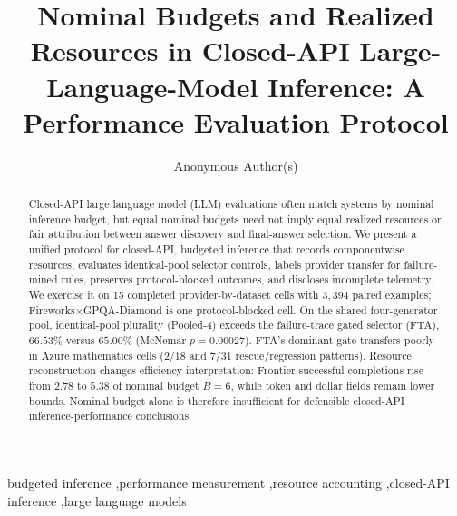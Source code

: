 \documentclass[preprint,12pt]{elsarticle}
\begin{document}
\begin{frontmatter}

\title{Nominal Budgets and Realized Resources in Closed-API Large-Language-Model Inference: A Performance Evaluation Protocol}

\author{Anonymous Author(s)}
\address{Anonymous Institution}

\begin{abstract}
Closed-API large language model (LLM) evaluations often match systems by nominal inference budget,
but equal nominal budgets need not imply equal realized resources or fair attribution between answer
discovery and final-answer selection. We present a unified protocol for closed-API, budgeted
inference that records componentwise resources, evaluates identical-pool selector controls, labels
provider transfer for failure-mined rules, preserves protocol-blocked outcomes, and discloses
incomplete telemetry. We exercise it on 15 completed provider-by-dataset cells with $3{,}394$ paired
examples; Fireworks$\times$GPQA-Diamond is one protocol-blocked cell. On the shared four-generator
pool, identical-pool plurality (Pooled-4) exceeds the failure-trace gated selector (FTA), $66.53\%$
versus $65.00\%$ (McNemar $p{=}0.00027$). FTA's dominant gate transfers poorly in Azure mathematics
cells ($2/18$ and $7/31$ rescue/regression patterns). Resource reconstruction changes efficiency
interpretation: Frontier successful completions rise from $2.78$ to $5.38$ of nominal budget
$B{=}6$, while token and dollar fields remain lower bounds. Nominal budget alone is therefore
insufficient for defensible closed-API inference-performance conclusions.
\end{abstract}

\begin{keyword}
budgeted inference \sep performance measurement \sep resource accounting \sep closed-API inference \sep large language models
\end{keyword}

\end{frontmatter}














\end{document}
